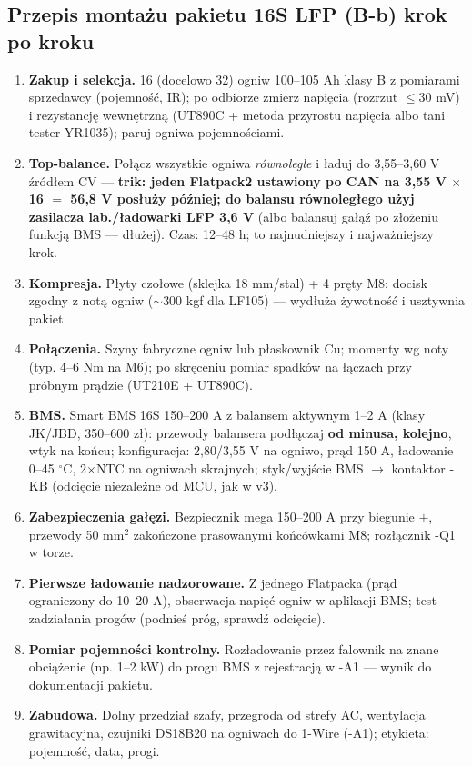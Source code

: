 \documentclass[11pt,a4paper]{article}
\begin{document}
\subsection{Przepis montażu pakietu 16S LFP (B-b) krok po kroku}
\begin{enumerate}
\item \textbf{Zakup i selekcja.} 16 (docelowo 32) ogniw 100--105 Ah klasy B z pomiarami sprzedawcy
(pojemność, IR); po odbiorze zmierz napięcia (rozrzut $\le$30 mV) i rezystancję wewnętrzną
(UT890C + metoda przyrostu napięcia albo tani tester YR1035); paruj ogniwa pojemnościami.
\item \textbf{Top-balance.} Połącz wszystkie ogniwa \emph{równolegle} i ładuj do 3,55--3,60 V
źródłem CV --- \textbf{trik: jeden Flatpack2 ustawiony po CAN na 3,55 V $\times$ 16 $=$ 56,8 V
posłuży później; do balansu równoległego użyj zasilacza lab./ładowarki LFP 3,6 V} (albo balansuj
gałąź po złożeniu funkcją BMS --- dłużej). Czas: 12--48 h; to najnudniejszy i najważniejszy krok.
\item \textbf{Kompresja.} Płyty czołowe (sklejka 18 mm/stal) + 4 pręty M8: docisk zgodny z notą
ogniw ($\sim$300 kgf dla LF105) --- wydłuża żywotność i usztywnia pakiet.
\item \textbf{Połączenia.} Szyny fabryczne ogniw lub płaskownik Cu; momenty wg noty (typ. 4--6 Nm
na M6); po skręceniu pomiar spadków na łączach przy próbnym prądzie (UT210E + UT890C).
\item \textbf{BMS.} Smart BMS 16S 150--200 A z balansem aktywnym 1--2 A (klasy JK/JBD, 350--600 zł):
przewody balansera podłączaj \textbf{od minusa, kolejno}, wtyk na końcu; konfiguracja: 2,80/3,55 V
na ogniwo, prąd 150 A, ładowanie 0--45 $^\circ$C, 2$\times$NTC na ogniwach skrajnych;
styk/wyjście BMS $\to$ kontaktor -KB (odcięcie niezależne od MCU, jak w v3).
\item \textbf{Zabezpieczenia gałęzi.} Bezpiecznik mega 150--200 A przy biegunie $+$, przewody
50 mm$^2$ zakończone prasowanymi końcówkami M8; rozłącznik -Q1 w torze.
\item \textbf{Pierwsze ładowanie nadzorowane.} Z jednego Flatpacka (prąd ograniczony do 10--20 A),
obserwacja napięć ogniw w aplikacji BMS; test zadziałania progów (podnieś próg, sprawdź odcięcie).
\item \textbf{Pomiar pojemności kontrolny.} Rozładowanie przez falownik na znane obciążenie
(np. 1--2 kW) do progu BMS z rejestracją w -A1 --- wynik do dokumentacji pakietu.
\item \textbf{Zabudowa.} Dolny przedział szafy, przegroda od strefy AC, wentylacja grawitacyjna,
czujniki DS18B20 na ogniwach do 1-Wire (-A1); etykieta: pojemność, data, progi.
\end{enumerate}
\end{document}
